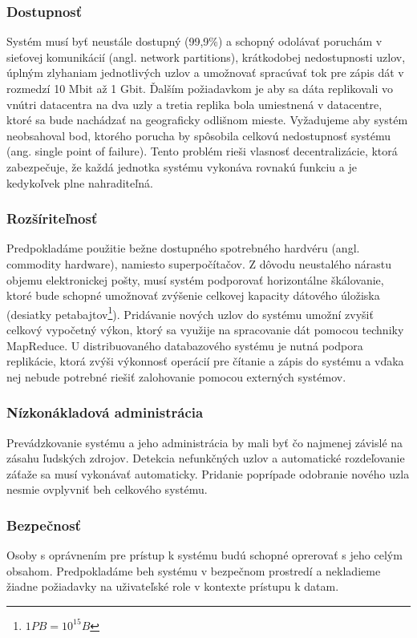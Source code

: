 \documentclass[11pt,twoside,a4paper]{book}
\begin{document}
\subsubsection*{Dostupnosť}
Systém musí byť neustále dostupný (99,9\%) a schopný odolávať poruchám v sieťovej komunikácií (angl. network partitions), krátkodobej nedostupnosti uzlov, úplným zlyhaniam jednotlivých uzlov a umožnovať spracúvať tok pre zápis dát v rozmedzí 10 Mbit až 1 Gbit. Ďalším požiadavkom je aby sa dáta replikovali vo vnútri datacentra na dva uzly a tretia replika bola umiestnená v datacentre, ktoré sa bude nachádzať na geograficky odlišnom mieste. Vyžadujeme aby systém neobsahoval bod, ktorého porucha by spôsobila celkovú nedostupnosť systému (ang. single point of failure). Tento problém rieši vlasnosť decentralizácie, ktorá zabezpečuje, že každá jednotka systému vykonáva rovnakú funkciu a je kedykoľvek plne nahraditeľná.

\subsubsection*{Rozšíriteľnosť}
Predpokladáme použitie bežne dostupného spotrebného hardvéru (angl. commodity hardware), namiesto superpočítačov. Z dôvodu neustalého nárastu objemu elektronickej pošty, musí systém podporovať horizontálne škálovanie, ktoré bude schopné umožnovať zvýšenie celkovej kapacity dátového úložiska (desiatky petabajtov\footnote{$ 1PB = 10^{15} B$}). Pridávanie nových uzlov do systému umožní zvyšiť celkový vypočetný výkon, ktorý sa využije na spracovanie dát pomocou techniky MapReduce. U distribuovaného databazového systému je nutná podpora replikácie, ktorá zvýši výkonnosť operácií pre čítanie a zápis do systému a vďaka nej nebude potrebné riešiť zalohovanie pomocou externých systémov.

\subsubsection*{Nízkonákladová administrácia}
Prevádzkovanie systému a jeho administrácia by mali byť čo najmenej závislé na zásahu ľudských zdrojov. Detekcia nefunkčných uzlov a automatické rozdeľovanie záťaže sa musí vykonávať automaticky. Pridanie poprípade odobranie nového uzla nesmie ovplyvniť beh celkového systému.

\subsubsection*{Bezpečnosť}
Osoby s oprávnením pre prístup k systému budú schopné oprerovať s jeho celým obsahom. Predpokladáme beh systému v bezpečnom prostredí a nekladieme žiadne požiadavky na uživateľské role v kontexte prístupu k datam.
\end{document}

